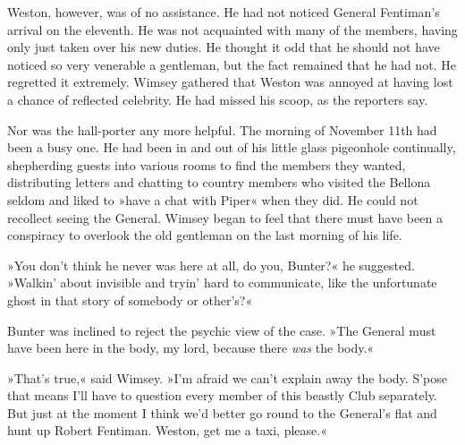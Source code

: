 Weston, however, was of no assistance. He had not noticed General Fentiman's arrival on the eleventh. He was not acquainted with many of the members, having only just taken over his new duties. He thought it odd that he should not have noticed so very venerable a gentleman, but the fact remained that he had not. He regretted it extremely. Wimsey gathered that Weston was annoyed at having lost a chance of reflected celebrity. He had missed his scoop, as the reporters say.

Nor was the hall-porter any more helpful. The morning of November  11th had been a busy one. He had been in and out of his little glass pigeonhole continually, shepherding guests into various rooms to find the members they wanted, distributing letters and chatting to country members who visited the Bellona seldom and liked to »have a chat with Piper« when they did. He could not recollect seeing the General. Wimsey began to feel that there must have been a conspiracy to overlook the old gentleman on the last morning of his life.

»You don't think he never was here at all, do you, Bunter?« he suggested. »Walkin' about invisible and tryin' hard to communicate, like the unfortunate ghost in that story of somebody or other's?«

Bunter was inclined to reject the psychic view of the case. »The General must have been here in the body, my lord, because there \textit{was} the body.«

»That's true,« said Wimsey. »I'm afraid we can't explain away the body. S'pose that means I'll have to question every member of this beastly Club separately. But just at the moment I think we'd better go round to the General's flat and hunt up Robert Fentiman. Weston, get me a taxi, please.«